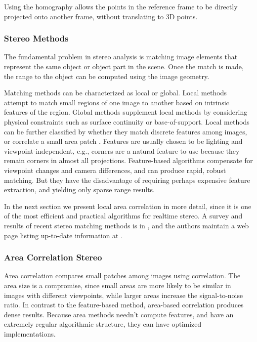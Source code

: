 \documentclass[twocolumn,oneside]{book}
\begin{document}
\noindent Using the homography allows the points
in the reference frame to be directly projected onto another frame,
without translating to 3D points.

\subsubsection{Stereo Methods}

The fundamental problem in stereo analysis is matching image elements
that represent the same object or object part in the scene.  Once the
match is made, the range to the object can be computed using the image
geometry.

Matching methods can be characterized as local or global.  Local
methods attempt to match small regions of one image to another based
on intrinsic features of the region.  Global methods supplement local
methods by considering physical constraints such as surface continuity
or base-of-support.  Local methods can be further classified by
whether they match discrete features among images, or correlate a
small area patch \cite{barnard1982}.  Features are usually
chosen to be lighting and viewpoint-independent, e.g., corners are a
natural feature to use because they remain corners in almost all
projections.  Feature-based algorithms compensate for viewpoint
changes and camera differences, and can produce rapid, robust
matching. But they have the disadvantage of requiring perhaps
expensive feature extraction, and yielding only sparse range results.

In the next section we present local area correlation in more detail,
since it is one of the most efficient and practical algorithms for
realtime stereo.  A survey and results of recent stereo matching
methods is in \cite{scharstein02taxonomy}, and the authors maintain a
web page listing up-to-date information at \cite{middlebury}.


\subsubsection{Area Correlation Stereo} 

Area correlation compares small patches among images using
correlation.  The area size is a compromise, since small areas are
more likely to be similar in images with different viewpoints, while
larger areas increase the signal-to-noise ratio.  In contrast to the
feature-based method, area-based correlation produces dense results.
Because area methods needn't compute features, and have an extremely
regular algorithmic structure, they can have optimized
implementations.  
\end{document}
